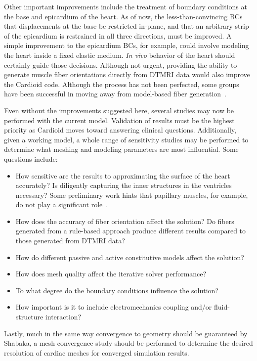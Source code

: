 Other important improvements include the treatment of boundary conditions at the base and epicardium of the heart. As of now, the less-than-convincing BCs that displacements at the base be restricted in-plane, and that an arbitrary strip of the epicardium is restrained in all three directions, must be improved. A simple improvement to the epicardium BCs, for example, could involve modeling the heart inside a fixed elastic medium. \textit{In vivo} behavior of the heart should certainly guide those decisions. Although not urgent, providing the ability to generate muscle fiber orientations directly from DTMRI data would also improve the Cardioid code. Although the process has not been perfected, some groups have been successful in moving away from model-based fiber generation~\cite{yang_2012, zhukov_2003}.

Even without the improvements suggested here, several studies may now be performed with the current model. Validation of results must be the highest priority as Cardioid moves toward answering clinical questions. Additionally, given a working model, a whole range of sensitivity studies may be performed to determine what meshing and modeling parameters are most influential. Some questions include:
\begin{itemize}[noitemsep]
\item How sensitive are the results to approximating the surface of the heart accurately? Is diligently capturing the inner structures in the ventricles necessary? Some preliminary work hints that papillary muscles, for example, do not play a significant role~\cite{korte_2019}.
\item How does the accuracy of fiber orientation affect the solution? Do fibers generated from a rule-based approach produce different results compared to those generated from DTMRI data?
\item How do different passive and active constitutive models affect the solution?
\item How does mesh quality affect the iterative solver performance?
\item To what degree do the boundary conditions influence the solution?
\item How important is it to include electromechanics coupling and/or fluid-structure interaction?
\end{itemize} 
Lastly, much in the same way convergence to geometry should be guaranteed by Shabaka, a mesh convergence study should be performed to determine the desired resolution of cardiac meshes for converged simulation results.

